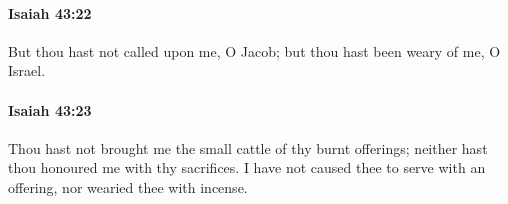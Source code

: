 		\paragraph{Isaiah 43:22} %
			\label{ISAIAH-43-22}

			But thou hast not called upon me, O Jacob; but thou hast been weary of me, O Israel.


		\paragraph{Isaiah 43:23} %
			\label{ISAIAH-43-23}

			Thou hast not brought me the small cattle of thy burnt offerings; neither hast thou honoured me with thy sacrifices. I have not caused thee to serve with an offering, nor wearied thee with incense.


